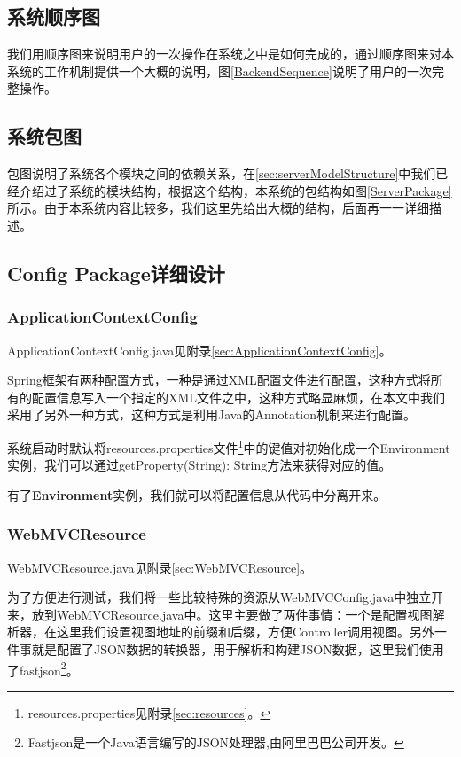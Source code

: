 \subsection{系统顺序图}
我们用顺序图来说明用户的一次操作在系统之中是如何完成的，通过顺序图来对本系统的工作机制提供一个大概的说明，图\ref{BackendSequence}说明了用户的一次完整操作。


\subsection{系统包图}
包图说明了系统各个模块之间的依赖关系，在\ref{sec:serverModelStructure}中我们已经介绍过了系统的模块结构，根据这个结构，本系统的包结构如图\ref{ServerPackage}所示。由于本系统内容比较多，我们这里先给出大概的结构，后面再一一详细描述。

\subsection{Config Package详细设计}


\subsubsection{ApplicationContextConfig}
ApplicationContextConfig.java见附录\ref{sec:ApplicationContextConfig}。

Spring框架有两种配置方式，一种是通过XML配置文件进行配置，这种方式将所有的配置信息写入一个指定的XML文件之中，这种方式略显麻烦，在本文中我们采用了另外一种方式，这种方式是利用Java的Annotation机制来进行配置。

系统启动时默认将resources.properties文件\footnote{resources.properties见附录\ref{sec:resources}。}中的键值对初始化成一个Environment实例，我们可以通过getProperty(String): String方法来获得对应的值。

有了\textbf{Environment}实例，我们就可以将配置信息从代码中分离开来。

\subsubsection{WebMVCResource}
WebMVCResource.java见附录\ref{sec:WebMVCResource}。

为了方便进行测试，我们将一些比较特殊的资源从WebMVCConfig.java中独立开来，放到WebMVCResource.java中。这里主要做了两件事情：一个是配置视图解析器，在这里我们设置视图地址的前缀和后缀，方便Controller调用视图。另外一件事就是配置了JSON数据的转换器，用于解析和构建JSON数据，这里我们使用了fastjson\footnote{Fastjson是一个Java语言编写的JSON处理器,由阿里巴巴公司开发。}。

